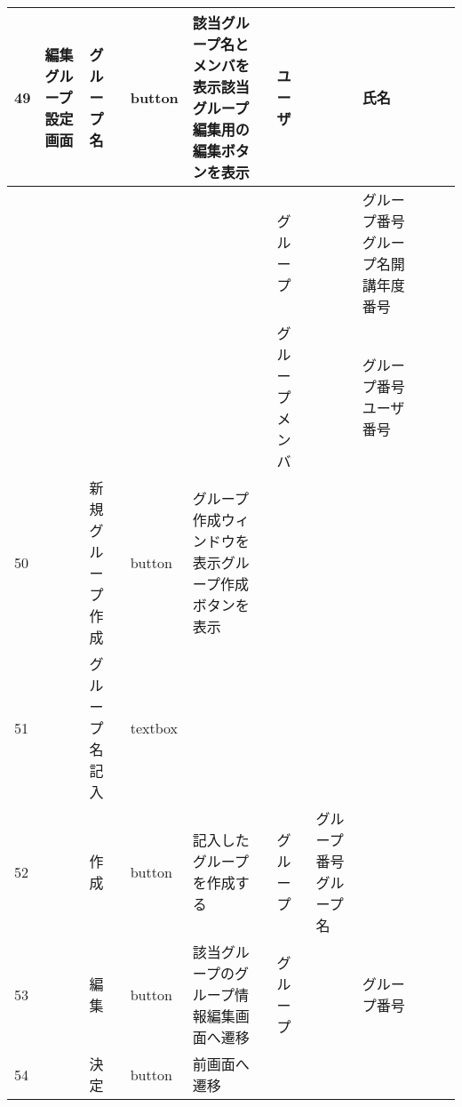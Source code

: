 \begin{table}[]
\begin{tabular}{|l|l|l|l|l|l|l|l|l|l|l|}
49  & 編集グループ設定画面    & グループ名            & button   & 該当グループ名とメンバを表示該当グループ編集用の編集ボタンを表示                                  & ユーザ     &                       & 氏名                 &                 &                               &                                                                \\ \hline
    &               &                  &          &                                                                   & グループ    &                       & グループ番号グループ名開講年度番号  &                 &                               &                                                                \\ \hline
    &               &                  &          &                                                                   & グループメンバ &                       & グループ番号ユーザ番号        &                 &                               &                                                                \\ \hline
50  &               & 新規グループ作成         & button   & グループ作成ウィンドウを表示グループ作成ボタンを表示                                        &         &                       &                    &                 &                               &                                                                \\ \hline
51  &               & グループ名記入          & textbox  &                                                                   &         &                       &                    &                 &                               &                                                                \\ \hline
52  &               & 作成               & button   & 記入したグループを作成する                                                     & グループ    & グループ番号グループ名           &                    &                 &                               &                                                                \\ \hline
53  &               & 編集               & button   & 該当グループのグループ情報編集画面へ遷移                                              & グループ    &                       & グループ番号             &                 &                               &                                                                \\ \hline
54  &               & 決定               & button   & 前画面へ遷移                                                            &         &                       &                    &                 &                               &                                                                \\ \hline
\end{tabular}
\end{table}

